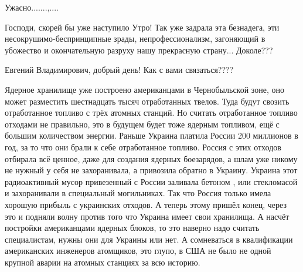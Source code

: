 \begin{itemize}
 
Ужасно.......,....

 

Господи, скорей бы уже наступило Утро! Так уже задрала эта безнадега, эти
несокрушимо-беспринципные зрады, непрофессионализм, загоняющий в убожество и
окончательную разруху нашу прекрасную страну... Доколе???


 
Евгений Владимирович, добрый день! Как с вами связаться????

 

Ядерное хранилище уже построено американцами в Чернобыльской зоне, оно может
разместить шестнадцать тысяч отработанных твелов. Туда будут свозить
отработанное топливо с трёх атомных станций. Но считать отработанное топливо
отходами не правильно, это в будущем будет тоже ядерным топливом, ещё с большим
количеством энергии. Раньше Украина платила России 200 миллионов в год, за то
что они брали к себе отработанное топливо. Россия с этих отходов отбирала всё
ценное, даже для создания ядерных боезарядов, а шлам уже никому не нужный у
себя не захоранивала, а привозила обратно в Украину. Украина этот радиоактивный
мусор привезенный с России заливала бетоном , или стекломасой и захоранивали в
специальный могильниках. Так что Россия только имела хорошую прибыль с
украинских отходов. А теперь этому пришёл конец, через это и подняли волну
против того что Украина имеет свои хранилища. А насчёт постройки американцами
ядерных блоков, то это наверно надо считать специалистам, нужны они для Украины
или нет. А сомневаться в квалификации американских инженеров атомщиков, это
глупо, в США не было не одной крупной аварии на атомных станциях за всю
историю.


\end{itemize}
